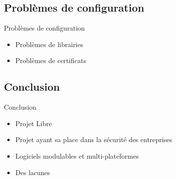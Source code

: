 \documentclass[t,12pt]{beamer}
\begin{document}
	\subsection{Problèmes de configuration}
		\begin{frame}{Problèmes de configuration}                        %
		\begin{itemize}
			\item Problèmes de librairies
			\newline
			\newline
			\item Problèmes de certificats
		\end{itemize}
		\end{frame}


	\subsection{Conclusion}
		\begin{frame}{Conclusion}                                                         %
		\begin{itemize}
			\item Projet Libre
			\newline
			\item Projet ayant sa place dans la sécurité des entreprises
			\newline
			\item Logiciels modulables et multi-plateformes
			\newline
			\item Des lacunes 
		\end{itemize}
		\end{frame}
\end{document}

